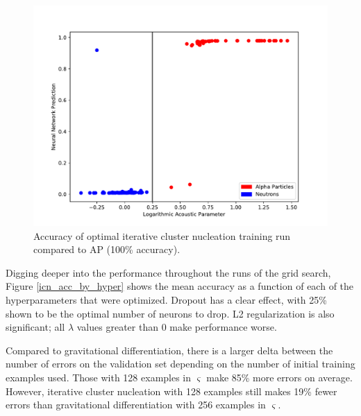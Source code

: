 \documentclass[10pt]{article}
\begin{document}
\begin{figure}[h]
    \centering
    \includegraphics[width=\textwidth]{icn_grid_search}
    \caption{\label{icn_grid_search} Accuracy of optimal iterative cluster nucleation training run compared to AP (100\% accuracy).}
\end{figure}

Digging deeper into the performance throughout the runs of the grid search, Figure \ref{icn_acc_by_hyper} shows the mean accuracy as a function of each of the hyperparameters that were optimized. Dropout has a clear effect, with 25\% shown to be the optimal number of neurons to drop. L2 regularization is also significant; all $\lambda$ values greater than 0 make performance worse.

Compared to gravitational differentiation, there is a larger delta between the number of errors on the validation set depending on the number of initial training examples used. Those with 128 examples in $\varsigma$ make 85\% more errors on average. However, iterative cluster nucleation with 128 examples still makes 19\% fewer errors than gravitational differentiation with 256 examples in $\varsigma$.
\end{document}
